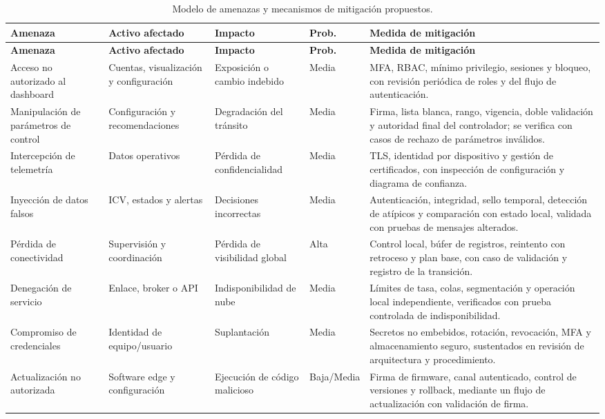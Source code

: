 \begin{landscape}
\footnotesize
\begin{longtable}{@{}p{4.2cm}p{3.6cm}p{3.6cm}p{1.8cm}p{10.2cm}@{}}
\caption{Modelo de amenazas y mecanismos de mitigación propuestos.}\label{tab:amenazas}\\
\toprule
\textbf{Amenaza} & \textbf{Activo afectado} & \textbf{Impacto} & \textbf{Prob.} & \textbf{Medida de mitigación}\\
\midrule
\endfirsthead
\toprule
\textbf{Amenaza} & \textbf{Activo afectado} & \textbf{Impacto} & \textbf{Prob.} & \textbf{Medida de mitigación}\\
\midrule
\endhead
\bottomrule
\endfoot
Acceso no autorizado al dashboard & Cuentas, visualización y configuración & Exposición o cambio indebido & Media & MFA, RBAC, mínimo privilegio, sesiones y bloqueo, con revisión periódica de roles y del flujo de autenticación.\\
Manipulación de parámetros de control & Configuración y recomendaciones & Degradación del tránsito & Media & Firma, lista blanca, rango, vigencia, doble validación y autoridad final del controlador; se verifica con casos de rechazo de parámetros inválidos.\\
Intercepción de telemetría & Datos operativos & Pérdida de confidencialidad & Media & TLS, identidad por dispositivo y gestión de certificados, con inspección de configuración y diagrama de confianza.\\
Inyección de datos falsos & ICV, estados y alertas & Decisiones incorrectas & Media & Autenticación, integridad, sello temporal, detección de atípicos y comparación con estado local, validada con pruebas de mensajes alterados.\\
Pérdida de conectividad & Supervisión y coordinación & Pérdida de visibilidad global & Alta & Control local, búfer de registros, reintento con retroceso y plan base, con caso de validación y registro de la transición.\\
Denegación de servicio & Enlace, broker o API & Indisponibilidad de nube & Media & Límites de tasa, colas, segmentación y operación local independiente, verificados con prueba controlada de indisponibilidad.\\
Compromiso de credenciales & Identidad de equipo/usuario & Suplantación & Media & Secretos no embebidos, rotación, revocación, MFA y almacenamiento seguro, sustentados en revisión de arquitectura y procedimiento.\\
Actualización no autorizada & Software edge y configuración & Ejecución de código malicioso & Baja/Media & Firma de firmware, canal autenticado, control de versiones y rollback, mediante un flujo de actualización con validación de firma.\\

\end{longtable}
\end{landscape}
